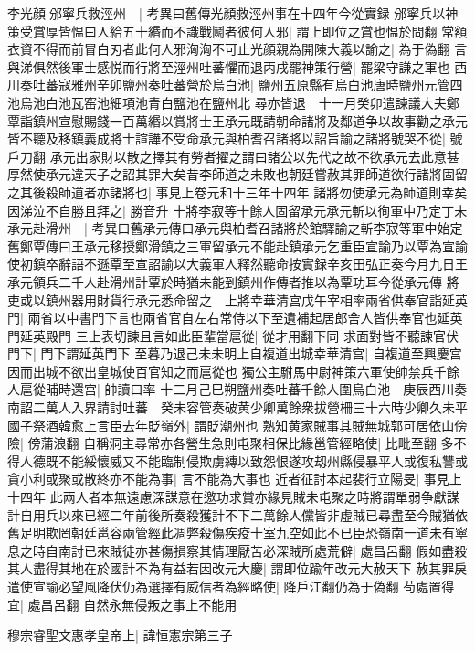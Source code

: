 李光顔邠寧兵救涇州　|{
	考異曰舊傳光顔救涇州事在十四年今從實録}
邠寧兵以神策受賞厚皆愠曰人給五十緡而不識戰鬭者彼何人邪|{
	謂上即位之賞也愠於問翻}
常額衣資不得而前冒白刃者此何人邪洶洶不可止光顔親為開陳大義以諭之|{
	為于偽翻}
言與涕俱然後軍士感悦而行將至涇州吐蕃懼而退丙戌罷神策行營|{
	罷梁守謙之軍也}
西川奏吐蕃寇雅州辛卯鹽州奏吐蕃營於烏白池|{
	鹽州五原縣有烏白池唐時鹽州元管四池烏池白池瓦窑池細項池青白鹽池在鹽州北}
尋亦皆退　十一月癸卯遣諫議大夫鄭覃詣鎮州宣慰賜錢一百萬緡以賞將士王承元既請朝命諸將及鄰道争以故事勸之承元皆不聽及移鎮義成將士諠譁不受命承元與柏耆召諸將以詔旨諭之諸將號哭不從|{
	號戶刀翻}
承元出家財以散之擇其有勞者擢之謂曰諸公以先代之故不欲承元去此意甚厚然使承元違天子之詔其罪大矣昔李師道之未敗也朝廷嘗赦其罪師道欲行諸將固留之其後殺師道者亦諸將也|{
	事見上卷元和十三年十四年}
諸將勿使承元為師道則幸矣因涕泣不自勝且拜之|{
	勝音升}
十將李寂等十餘人固留承元承元斬以徇軍中乃定丁未承元赴滑州　|{
	考異曰舊承元傳曰承元與柏耆召諸將於館驛諭之斬李寂等軍中始定舊鄭覃傳曰王承元移授鄭滑鎮之三軍留承元不能赴鎮承元乞重臣宣諭乃以覃為宣諭使初鎮卒辭語不遜覃至宣詔諭以大義軍人釋然聽命按實録辛亥田弘正奏今月九日王承元領兵二千人赴滑州計覃於時猶未能到鎮州作傳者推以為覃功耳今從承元傳}
將吏或以鎮州器用財貨行承元悉命留之　上將幸華清宫戊午宰相率兩省供奉官詣延英門|{
	兩省以中書門下言也兩省官自左右常侍以下至遺補起居郎舍人皆供奉官也延英門延英殿門}
三上表切諫且言如此臣輩當扈從|{
	從才用翻下同}
求面對皆不聽諫官伏門下|{
	門下謂延英門下}
至暮乃退己未未明上自複道出城幸華清宫|{
	自複道至興慶宫因而出城不欲出皇城使百官知之而扈從也}
獨公主駙馬中尉神策六軍使帥禁兵千餘人扈從晡時還宫|{
	帥讀曰率}
十二月己巳朔鹽州奏吐蕃千餘人圍烏白池　庚辰西川奏南詔二萬人入界請討吐蕃　癸未容管奏破黄少卿萬餘衆拔營柵三十六時少卿久未平國子祭酒韓愈上言臣去年貶嶺外|{
	謂貶潮州也}
熟知黄家賊事其賊無城郭可居依山傍險|{
	傍蒲浪翻}
自稱洞主尋常亦各營生急則屯聚相保比緣邕管經略使|{
	比毗至翻}
多不得人德既不能綏懷威又不能臨制侵欺虜縳以致怨恨遂攻刼州縣侵暴平人或復私讐或貪小利或聚或散終亦不能為事|{
	言不能為大事也}
近者征討本起裴行立陽旻|{
	事見上十四年}
此兩人者本無遠慮深謀意在邀功求賞亦緣見賊未屯聚之時將謂單弱争獻謀計自用兵以來已經二年前後所奏殺獲計不下二萬餘人儻皆非虛賊已尋盡至今賊猶依舊足明欺罔朝廷邕容兩管經此凋弊殺傷疾疫十室九空如此不已臣恐嶺南一道未有寧息之時自南討已來賊徒亦甚傷損察其情理厭苦必深賊所處荒僻|{
	處昌呂翻}
假如盡殺其人盡得其地在於國計不為有益若因改元大慶|{
	謂即位踰年改元大赦天下}
赦其罪戾遣使宣諭必望風降伏仍為選擇有威信者為經略使|{
	降戶江翻仍為于偽翻}
苟處置得宜|{
	處昌呂翻}
自然永無侵叛之事上不能用

穆宗睿聖文惠孝皇帝上|{
	諱恒憲宗第三子}


